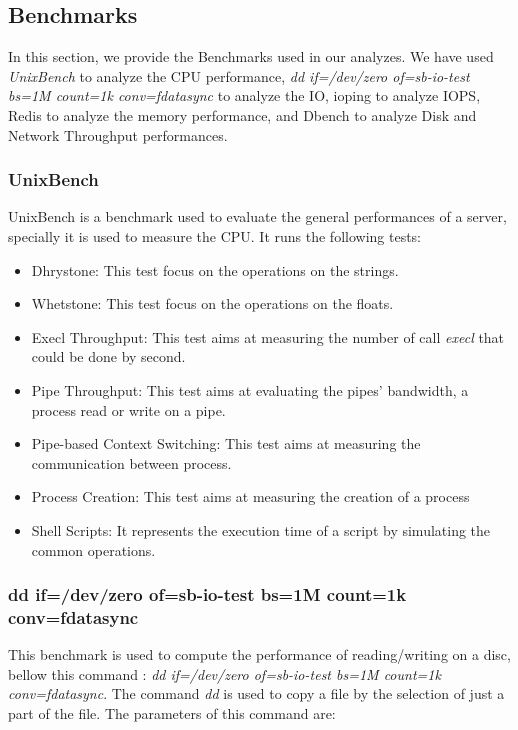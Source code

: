 \documentclass[10pt, conference]{IEEEtran}
\begin{document}
\subsection{Benchmarks}

In this section, we provide the Benchmarks used in our analyzes. We have used \textit{UnixBench} to analyze the CPU performance, \textit{dd if=/dev/zero of=sb-io-test bs=1M count=1k conv=fdatasync} to analyze the IO, ioping to analyze IOPS, Redis to analyze the memory performance, and Dbench to analyze Disk and Network Throughput performances. 

\subsubsection{UnixBench}


UnixBench is a benchmark used to evaluate the general performances of a server, specially it is used to measure the CPU. It runs the following tests:

\begin{itemize}

\item Dhrystone: This test focus on the operations on the strings.
\item Whetstone: This test focus on the operations on the floats.
\item Execl Throughput: This test aims at measuring the number of call \textit{execl} that could be done by second.
\item Pipe Throughput: This test aims at evaluating the pipes' bandwidth, a process read or write on a pipe.
\item Pipe-based Context Switching: This test aims at measuring the communication between process.
\item Process Creation: This test aims at measuring the creation of a process
\item Shell Scripts: It represents the execution time of a script by simulating the common operations. 

\end{itemize}

\subsubsection{dd if=/dev/zero of=sb-io-test bs=1M count=1k conv=fdatasync}

This benchmark is used to compute the performance of reading/writing on a disc, bellow this command : \textit{dd if=/dev/zero of=sb-io-test bs=1M count=1k conv=fdatasync}. The command \textit{dd} is used to copy a file by the selection of just a part of the file. The parameters of this command are:
\end{document}

